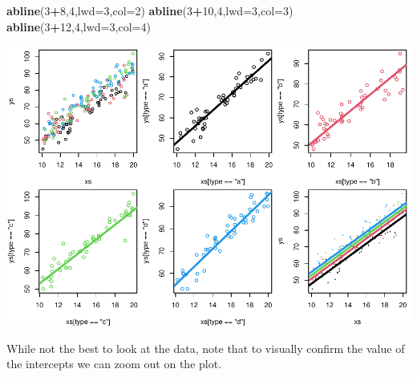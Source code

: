 \documentclass[
]{book}
\newenvironment{Shaded}{\begin{snugshade}}{\end{snugshade}}
\newcommand{\DataTypeTok}[1]{\textcolor[rgb]{0.13,0.29,0.53}{#1}}
\newcommand{\DecValTok}[1]{\textcolor[rgb]{0.00,0.00,0.81}{#1}}
\newcommand{\KeywordTok}[1]{\textcolor[rgb]{0.13,0.29,0.53}{\textbf{#1}}}
\newcommand{\NormalTok}[1]{#1}
\newcommand{\OperatorTok}[1]{\textcolor[rgb]{0.81,0.36,0.00}{\textbf{#1}}}
\begin{document}
\begin{Shaded}
\begin{Highlighting}[]
\KeywordTok{abline}\NormalTok{(}\DecValTok{3}\OperatorTok{+}\DecValTok{8}\NormalTok{,}\DecValTok{4}\NormalTok{,}\DataTypeTok{lwd=}\DecValTok{3}\NormalTok{,}\DataTypeTok{col=}\DecValTok{2}\NormalTok{)}
\KeywordTok{abline}\NormalTok{(}\DecValTok{3}\OperatorTok{+}\DecValTok{10}\NormalTok{,}\DecValTok{4}\NormalTok{,}\DataTypeTok{lwd=}\DecValTok{3}\NormalTok{,}\DataTypeTok{col=}\DecValTok{3}\NormalTok{)}
\KeywordTok{abline}\NormalTok{(}\DecValTok{3}\OperatorTok{+}\DecValTok{12}\NormalTok{,}\DecValTok{4}\NormalTok{,}\DataTypeTok{lwd=}\DecValTok{3}\NormalTok{,}\DataTypeTok{col=}\DecValTok{4}\NormalTok{)}
\end{Highlighting}
\end{Shaded}

\includegraphics{ECOMODbook_files/figure-latex/a9.2-1.pdf}

While not the best to look at the data, note that to visually confirm the value of the intercepts we can zoom out on the plot.
\end{document}
